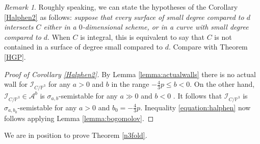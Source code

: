 \documentclass[9pt,a4paper]{amsart}
\theoremstyle{plain}
\theoremstyle{definition}
\theoremstyle{remark}
\newtheorem{remark}[theorem]{Remark}
\begin{document}
\begin{remark}
Roughly speaking, we can state the hypotheses of the Corollary
\ref{Halphen2} as follows: {\it suppose that every surface of small
degree compared to $d$ intersects $C$ either in a $0$-dimensional scheme,
or in a curve
with small degree compared to $d$}. When $C$ is integral, this is
equivalent to say that $C$ is not contained in a surface of degree
small compared to $d$. Compare with Theorem \ref{HGP}.
\end{remark}

\begin{proof}[Proof of Corollary \ref{Halphen2}]
By Lemma \ref{lemma:actualwalls} there is no actual wall for $
\mathcal I_{C/\mathbb{P}^3} $ for any $a > 0$ and $b$ in the range
$-\frac{4}{3}p \leq b < 0$. On the other hand, $
\mathcal I_{C/\mathbb{P}^3}\in\mathcal A^b$ is $\sigma_{a,b}$-semistable for
any $a \gg 0 $ and $ b < 0 $ \cite[Lemma 2.3 and p. 10, two lines
above Proposition 3.2]{Liu}. It follows that $\mathcal I_{C/\mathbb{P}^3} $
is $\sigma_{a,b_0}$-semistable for any $a > 0$ and $b_0 =
-\frac{4}{3} p $. Inequality \eqref{equation:halphen} now follows
applying Lemma \ref{lemma:bogomolov}.\end{proof}


\smallskip
We are in position to prove Theorem \ref{n3fold}.
\end{document}
